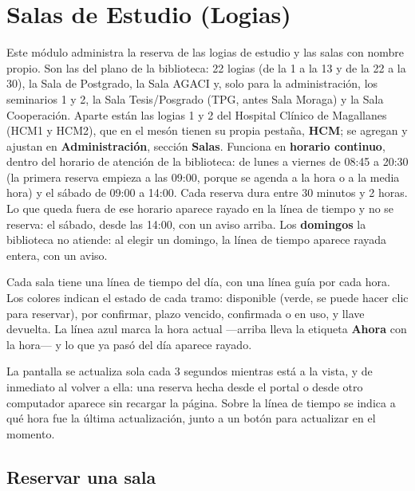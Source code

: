 \documentclass[11pt,a4paper]{report}
\begin{document}
\chapter{Salas de Estudio (Logias)}

Este módulo administra la reserva de las logias de estudio y las salas con
nombre propio. Son las del plano de la biblioteca: 22 logias (de la 1 a la 13 y
de la 22 a la 30), la Sala de Postgrado, la Sala AGACI y, solo para la
administración, los seminarios 1 y 2, la Sala Tesis/Posgrado (TPG, antes Sala Moraga) y la Sala Cooperación. Aparte están
las logias 1 y 2 del Hospital Clínico de Magallanes (HCM1 y HCM2), que en el mesón
tienen su propia pestaña, \textbf{HCM}; se
agregan y ajustan en \textbf{Administración},
sección \textbf{Salas}. Funciona en \textbf{horario continuo}, dentro del horario de
atención de la biblioteca: de lunes a viernes de 08:45 a 20:30 (la primera
reserva empieza a las 09:00, porque se agenda a la hora o a la media hora)
y el sábado de 09:00 a 14:00. Cada reserva dura entre 30 minutos y 2
horas. Lo que queda fuera de ese horario aparece rayado en la línea de
tiempo y no se reserva: el sábado, desde las 14:00, con un aviso arriba.
Los \textbf{domingos} la biblioteca no atiende: al elegir un domingo, la
línea de tiempo aparece rayada entera, con un aviso.



Cada sala tiene una línea de tiempo del día, con una línea guía por
cada hora. Los colores indican el estado de cada tramo: disponible
(verde, se puede hacer clic para reservar), por confirmar, plazo vencido,
confirmada o en uso, y llave devuelta. La línea azul marca la hora
actual ---arriba lleva la etiqueta \textbf{Ahora} con la hora--- y lo que
ya pasó del día aparece rayado.

La pantalla se actualiza sola cada 3 segundos mientras está a la vista,
y de inmediato al volver a ella: una reserva hecha desde el portal o
desde otro computador aparece sin recargar la página. Sobre la línea de
tiempo se indica a qué hora fue la última actualización, junto a un botón
para actualizar en el momento.

\section{Reservar una sala}
\end{document}
